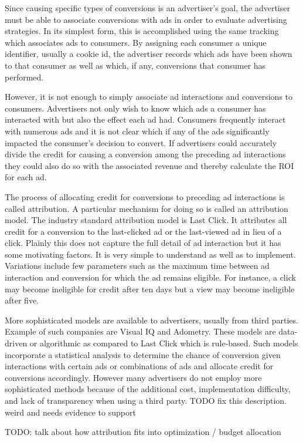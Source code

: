 \documentclass{article}
\begin{document}
Since causing specific types of conversions is an advertiser's goal, the advertiser must be able to associate conversions with ads in order to evaluate advertising strategies. In its simplest form, this is accomplished using the same tracking which associates ads to consumers. By assigning each consumer a unique identifier, usually a cookie id, the advertiser records which ads have been shown to that consumer as well as which, if any, conversions that consumer has performed.

However, it is not enough to simply associate ad interactions and conversions to consumers. Advertisers not only wish to know which ads a consumer has interacted with but also the effect each ad had. Consumers frequently interact with numerous ads and it is not clear which if any of the ads significantly impacted the consumer's decision to convert. If advertisers could accurately divide the credit for causing a conversion among the preceding ad interactions they could also do so with the associated revenue and thereby calculate the ROI for each ad.

The process of allocating credit for conversions to preceding ad interactions is called attribution. A particular mechanism for doing so is called an attribution model. The industry standard attribution model is Last Click. It attributes all credit for a conversion to the last-clicked ad or the last-viewed ad in lieu of a click. Plainly this does not capture the full detail of ad interaction but it has some motivating factors. It is very simple to understand as well as to implement. Variations include few parameters such as the maximum time between ad interaction and conversion for which the ad remains eligible. For instance, a click may become ineligible for credit after ten days but a view may become ineligible after five.

More sophisticated models are available to advertisers, usually from third parties. Example of such companies are Visual IQ and Adometry. These models are data-driven or algorithmic as compared to Last Click which is rule-based. Such models incorporate a statistical analysis to determine the chance of conversion given interactions with certain ads or combinations of ads and allocate credit for conversions accordingly. However many advertisers do not employ more sophisticated methods because of the additional cost, implementation difficulty, and lack of transparency when using a third party. TODO fix this description. weird and needs evidence to support

TODO: talk about how attribution fits into optimization / budget allocation
\end{document}
